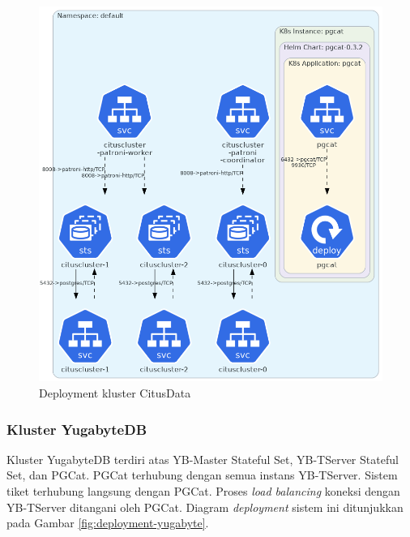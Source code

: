 \begin{figure}[H]
    \centering
    \includegraphics[width=1\textwidth]{resources/chapter-4/citusdata.png}
    \caption{Deployment kluster CitusData}
    \label{fig:deployment-citusdata}
\end{figure}

\pagebreak

\subsubsection{Kluster YugabyteDB}

Kluster YugabyteDB terdiri atas YB-Master Stateful Set, YB-TServer Stateful Set, dan PGCat. PGCat terhubung dengan semua instans YB-TServer. Sistem tiket terhubung langsung dengan PGCat. Proses \textit{load balancing} koneksi dengan YB-TServer ditangani oleh PGCat. Diagram \textit{deployment} sistem ini ditunjukkan pada Gambar \ref{fig:deployment-yugabyte}.

